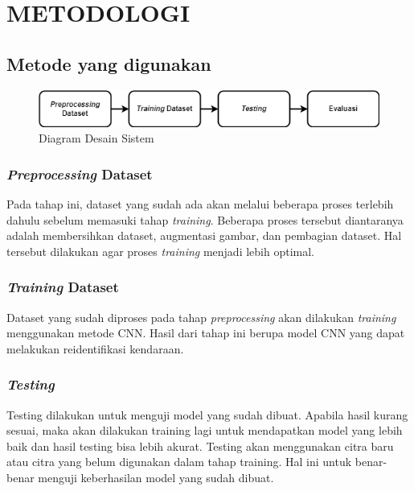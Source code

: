 \chapter{METODOLOGI}


\section{Metode yang digunakan}

\begin{figure} [ht] \centering
  \includegraphics[scale=0.75]{gambar/metodologi.png}
  \caption{Diagram Desain Sistem}
  \label{fig:DiagramMetodologi}
\end{figure}

\subsection{\emph{Preprocessing} Dataset}

Pada tahap ini, dataset yang sudah ada akan melalui beberapa proses terlebih dahulu sebelum memasuki tahap \emph{training}. Beberapa proses tersebut diantaranya adalah membersihkan dataset, augmentasi gambar, dan pembagian dataset. Hal tersebut dilakukan agar proses \emph{training} menjadi lebih optimal.

\subsection{\emph{Training} Dataset}

Dataset yang sudah diproses pada tahap \emph{preprocessing} akan dilakukan \emph{training} menggunakan metode CNN. Hasil dari tahap ini berupa model CNN yang dapat melakukan reidentifikasi kendaraan.

\subsection{\emph{Testing}}

Testing dilakukan untuk menguji model yang sudah dibuat. Apabila hasil kurang sesuai, maka akan dilakukan training lagi untuk mendapatkan model yang lebih baik dan hasil testing bisa lebih akurat. Testing akan menggunakan citra baru atau citra yang belum digunakan dalam tahap training. Hal ini untuk benar-benar menguji keberhasilan model yang sudah dibuat.


